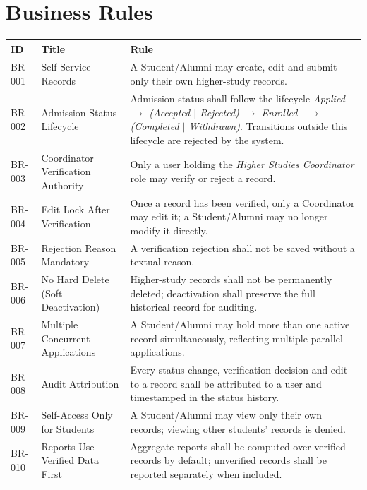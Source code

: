 \documentclass[11pt,a4paper]{article}
\begin{document}
\section{Business Rules}
\begin{tabularx}{\textwidth}{@{}p{1.4cm} p{5.2cm} Y@{}}
\caption{Business rules.}
\label{tab:br}
\toprule
\textbf{ID} & \textbf{Title} & \textbf{Rule} \\
\midrule
BR-001 & Self-Service Records &
  A Student/Alumni may create, edit and submit only their own higher-study records. \\
BR-002 & Admission Status Lifecycle &
  Admission status shall follow the lifecycle \emph{Applied $\rightarrow$ (Accepted $\mid$ Rejected) $\rightarrow$ Enrolled \ $\rightarrow$ (Completed $\mid$ Withdrawn)}. Transitions outside this lifecycle are rejected by the system. \\
BR-003 & Coordinator Verification Authority &
  Only a user holding the \emph{Higher Studies Coordinator} role may verify or reject a record. \\
BR-004 & Edit Lock After Verification &
  Once a record has been verified, only a Coordinator may edit it; a Student/Alumni may no longer modify it directly. \\
BR-005 & Rejection Reason Mandatory &
  A verification rejection shall not be saved without a textual reason. \\
BR-006 & No Hard Delete (Soft Deactivation) &
  Higher-study records shall not be permanently deleted; deactivation shall preserve the full historical record for auditing. \\
BR-007 & Multiple Concurrent Applications &
  A Student/Alumni may hold more than one active record simultaneously, reflecting multiple parallel applications. \\
BR-008 & Audit Attribution &
  Every status change, verification decision and edit to a record shall be attributed to a user and timestamped in the status history. \\
BR-009 & Self-Access Only for Students &
  A Student/Alumni may view only their own records; viewing other students' records is denied. \\
BR-010 & Reports Use Verified Data First &
  Aggregate reports shall be computed over verified records by default; unverified records shall be reported separately when included. \\
\bottomrule
\end{tabularx}
\end{document}
